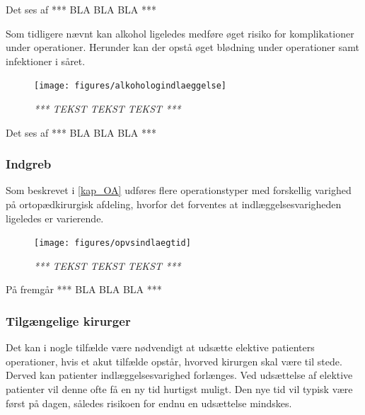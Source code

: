 \noindent
Det ses af  *** BLA BLA BLA ***


Som tidligere nævnt kan alkohol ligeledes medføre øget risiko for komplikationer under operationer. Herunder kan der opstå øget blødning under operationer samt infektioner i såret.\cite{Nordjylland2014} 


\begin{figure}[H]
	\flushleft 
	\centering
	\texttt{[image: figures/alkohologindlaeggelse]}
	\flushleft
	\caption{\textit{ *** TEKST TEKST TEKST *** }}
	\label{alkohologindlaeggelse}
\end{figure}


\noindent
Det ses af  *** BLA BLA BLA ***


\subsubsection{Indgreb}
Som beskrevet i \ref{kap_OA} udføres flere operationstyper med forskellig varighed på ortopædkirurgisk afdeling, hvorfor det forventes at indlæggelsesvarigheden ligeledes er varierende. 


\begin{figure}[H]
	\flushleft 
	\centering
	\texttt{[image: figures/opvsindlaegtid]}
	\flushleft
	\caption{\textit{*** TEKST TEKST TEKST *** }}
	\label{opvsindlaegtid}
\end{figure}


\noindent
På  fremgår *** BLA BLA BLA ***



\subsubsection{Tilgængelige kirurger}
Det kan i nogle tilfælde være nødvendigt at udsætte elektive patienters operationer, hvis et akut tilfælde opstår, hvorved kirurgen skal være til stede. Derved kan patienter indlæggelsesvarighed forlænges. Ved udsættelse af elektive patienter vil denne ofte få en ny tid hurtigst muligt. Den nye tid vil typisk være først på dagen, således risikoen for endnu en udsættelse mindskes.